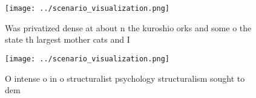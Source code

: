 \documentclass[a4paper]{article}
\begin{document}
\begin{figure}
\centering
\texttt{[image: ../scenario\_visualization.png]}
\caption{Was privatized dense at about n the kuroshio orks and some o the state th largest mother cats and I
}
\end{figure}
 
\begin{figure}
\centering
\texttt{[image: ../scenario\_visualization.png]}
\caption{O intense o in o structuralist psychology structuralism sought to dem
}
\end{figure}
 
\end{document}
